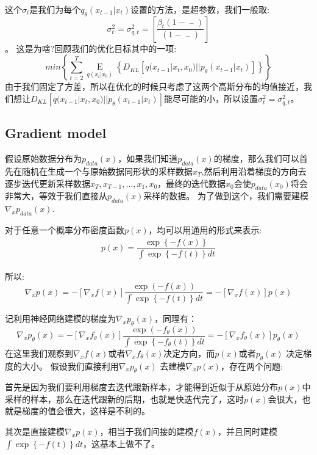 \documentclass[withoutpreface,bwprint]{cumcmthesis} %
\begin{document}
	这个$\sigma_t$是我们为每个$q_{\theta}(x_{t-1}|x_{t})$设置的方法，是超参数，我们一般取:
	$$
		\sigma_t^2=\sigma_{q,t}^2=\left[ \dfrac{  \beta_{t}\left( 1 - \mathop{\alpha_{t-1}}\limits^{-}  \right) }{\left( 1-\mathop{\alpha_{t}}\limits^{-} \right) } \right]
	$$。
	这是为啥?回顾我们的优化目标其中的一项:
	$$
		min \left\{ 
				\sum_{t=2}^{T}\mathop{E}\limits_{ q(x_{t}|x_0) }
			 \left\{ 
					D_{KL}\left[ q(x_{t-1}|x_t,x_0)||p_{\theta}(x_{t-1}|x_{t})\right]
		 	\right\} 
		 	\right\}
	$$
	由于我们固定了方差，所以在优化的时候只考虑了这两个高斯分布的均值接近，我们想让$D_{KL}\left[ q(x_{t-1}|x_t,x_0)||p_{\theta}(x_{t-1}|x_{t})\right]$能尽可能的小，所以设置$\sigma_t^2=\sigma_{q,t}^2$。
	\subsection{\Large Gradient model}
	假设原始数据分布为$p_{data}(x)$，如果我们知道$p_{data}(x)$的梯度，那么我们可以首先在随机在生成一个与原始数据同形状的采样数据$x_T$,然后利用沿着梯度的方向去逐步迭代更新采样数据$x_T,x_{T-1},...,x_{1},x_{0}$，最终的迭代数据$x_0$会使$p_{data}(x_0)$将会非常大，等效于我们直接从$p_{data}(x)$采样的数据。
	为了做到这个，我们需要建模$\nabla_{x} p_{data}(x) $.
	
	对于任意一个概率分布密度函数$p(x)$，均可以用通用的形式来表示:
	\begin{align*}
		p(x)= \dfrac{\exp \left\{ -f(x) \right\}}{\int \exp \left\{ -f(t) \right\} dt }
	\end{align*}
	
	所以:
	$$
		\nabla_x p(x) = - \left[ \nabla_x f(x) \right] \dfrac{\exp\left(- f(x) \right)}{\int \exp \left\{ -f(t) \right\} dt}=  - \left[ \nabla_x f(x) \right] p(x)
	$$
	
	记利用神经网络建模的梯度为$\nabla_x p_{\theta}(x)$，同理有：
	$$
		\nabla_{x} p_{\theta} (x) = - \left[ \nabla_x f_{\theta}(x) \right] \dfrac{\exp\left(- f_{\theta}(x) \right)}{\int \exp \left\{ -f_{\theta}(t) \right\} dt}=- \left[ \nabla_x f_{\theta}(x) \right] p_{\theta}(x)
	$$
	在这里我们观察到$\nabla_{x} f(x) $或者$\nabla_{x} f_{\theta}(x)$决定方向，而$p(x) $或者$ p_{\theta} (x)$ 决定梯度的大小。
	假设我们直接利用$\nabla_x p_{\theta}(x)$ 去建模$\nabla_{x} p(x)$，存在两个问题:
	
	首先是因为我们要利用梯度去迭代跟新样本，才能得到近似于从原始分布$p(x)$中采样的样本，那么在迭代跟新的后期，也就是快迭代完了，这时$p(x)$会很大，也就是梯度的值会很大，这样是不利的。
	
	其次是直接建模$\nabla_{x} p(x)$，相当于我们间接的建模$f(x)$，并且同时建模$\int \exp \left\{ -f(t) \right\} dt$，这基本上做不了。
	
\end{document}
